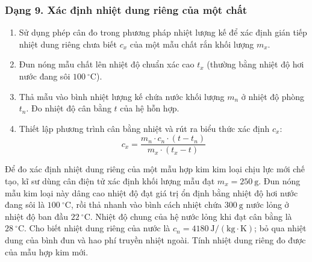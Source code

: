 \subsubsection{Dạng 9. Xác định nhiệt dung riêng của một chất}

\begin{phuongphap}
\begin{enumerate}
\item Sử dụng phép cân đo trong phương pháp nhiệt lượng kế để xác định gián tiếp nhiệt dung riêng chưa biết $c_x$ của một mẫu chất rắn khối lượng $m_x$.
\item Đun nóng mẫu chất lên nhiệt độ chuẩn xác cao $t_x$ (thường bằng nhiệt độ hơi nước đang sôi $100\ ^\circ\mathrm{C}$).
\item Thả mẫu vào bình nhiệt lượng kế chứa nước khối lượng $m_n$ ở nhiệt độ phòng $t_n$. Đo nhiệt độ cân bằng $t$ của hệ hỗn hợp.
\item Thiết lập phương trình cân bằng nhiệt và rút ra biểu thức xác định $c_x$:
\[
c_x = \dfrac{m_n \cdot c_n \cdot (t - t_n)}{m_x \cdot (t_x - t)}
\]
\end{enumerate}
\end{phuongphap}
\begin{vidumau}
Để đo xác định nhiệt dung riêng của một mẫu hợp kim kim loại chịu lực mới chế tạo, kĩ sư dùng cân điện tử xác định khối lượng mẫu đạt $m_x = 250\ \mathrm{g}$. Đun nóng mẫu kim loại này dâng cao nhiệt độ đạt giá trị ổn định bằng nhiệt độ hơi nước đang sôi là $100\ ^\circ\mathrm{C}$, rồi thả nhanh vào bình cách nhiệt chứa $300\ \mathrm{g}$ nước lỏng ở nhiệt độ ban đầu $22\ ^\circ\mathrm{C}$. Nhiệt độ chung của hệ nước lỏng khi đạt cân bằng là $28\ ^\circ\mathrm{C}$. Cho biết nhiệt dung riêng của nước là $c_n = 4180\ \mathrm{J/(kg\cdot K)}$; bỏ qua nhiệt dung của bình đun và hao phí truyền nhiệt ngoài. Tính nhiệt dung riêng đo được của mẫu hợp kim mới.
\end{vidumau}

